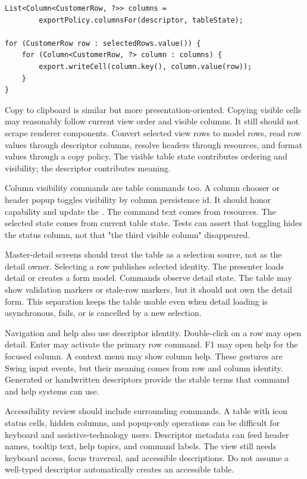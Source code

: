 \begin{lstlisting}[caption={Export starts from descriptors and rows, not renderers.}]
List<Column<CustomerRow, ?>> columns =
        exportPolicy.columnsFor(descriptor, tableState);

for (CustomerRow row : selectedRows.value()) {
    for (Column<CustomerRow, ?> column : columns) {
        export.writeCell(column.key(), column.value(row));
    }
}
\end{lstlisting}

Copy to clipboard is similar but more presentation-oriented. Copying visible
cells may reasonably follow current view order and visible columns. It still
should not scrape renderer components. Convert selected view rows to model
rows, read row values through descriptor columns, resolve headers through
resources, and format values through a copy policy. The visible table state
contributes ordering and visibility; the descriptor contributes meaning.

Column visibility commands are table commands too. A column chooser or header
popup toggles visibility by column persistence id. It should honor
 capability and update the . The
command text comes from resources. The selected state comes from current table
state. Tests can assert that toggling  hides the
status column, not that "the third visible column" disappeared.

Master-detail screens should treat the table as a selection source, not as
the detail owner. Selecting a row publishes selected identity. The presenter
loads detail or creates a form model. Commands observe detail state. The table
may show validation markers or stale-row markers, but it should not own the
detail form. This separation keeps the table usable even when detail loading
is asynchronous, fails, or is cancelled by a new selection.

Navigation and help also use descriptor identity. Double-click on a row may
open detail. Enter may activate the primary row command. F1 may open help for
the focused column. A context menu may show column help. These gestures are
Swing input events, but their meaning comes from row and column identity.
Generated or handwritten descriptors provide the stable terms that command
and help systems can use.

Accessibility review should include surrounding commands. A table with icon
status cells, hidden columns, and popup-only operations can be difficult for
keyboard and assistive-technology users. Descriptor metadata can feed header
names, tooltip text, help topics, and command labels. The view still needs
keyboard access, focus traversal, and accessible descriptions. Do not assume a
well-typed descriptor automatically creates an accessible table.

